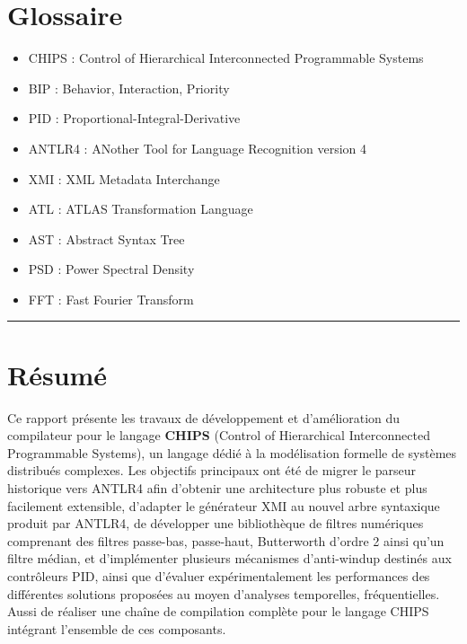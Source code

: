 \documentclass[a4paper, 11pt]{article}
\begin{document}
\FloatBarrier
\newpage

\section{Glossaire}

\begin{itemize}
    \item CHIPS : Control of Hierarchical Interconnected Programmable Systems
    \item BIP : Behavior, Interaction, Priority
    \item PID : Proportional-Integral-Derivative
    \item ANTLR4 : ANother Tool for Language Recognition version 4
    \item XMI : XML Metadata Interchange
    \item ATL : ATLAS Transformation Language
    \item AST : Abstract Syntax Tree
    \item PSD : Power Spectral Density
    \item FFT : Fast Fourier Transform
\end{itemize}

\FloatBarrier
\newpage

\printbibliography[heading=bibintoc,title={Références}]

\clearpage

\thispagestyle{empty}

\rule{\textwidth}{0.5pt}
\vspace{0.2cm}

\section*{Résumé}

Ce rapport présente les travaux de développement et d'amélioration du compilateur pour le langage \textbf{CHIPS} 
(Control of Hierarchical Interconnected Programmable Systems), un langage dédié à la modélisation formelle de systèmes distribués complexes. 
Les objectifs principaux ont été de migrer le parseur historique vers ANTLR4 afin d'obtenir une architecture plus robuste et plus facilement 
extensible, d'adapter le générateur XMI au nouvel arbre syntaxique produit par ANTLR4, de développer une bibliothèque de filtres numériques 
comprenant des filtres passe-bas, passe-haut, Butterworth d'ordre 2 ainsi qu'un filtre médian, et d'implémenter plusieurs mécanismes d'anti-windup 
destinés aux contrôleurs PID, ainsi que d'évaluer expérimentalement les performances des différentes solutions proposées au moyen d'analyses 
temporelles, fréquentielles. Aussi de réaliser une chaîne de compilation complète pour le langage CHIPS intégrant l'ensemble de ces composants.
\end{document}

